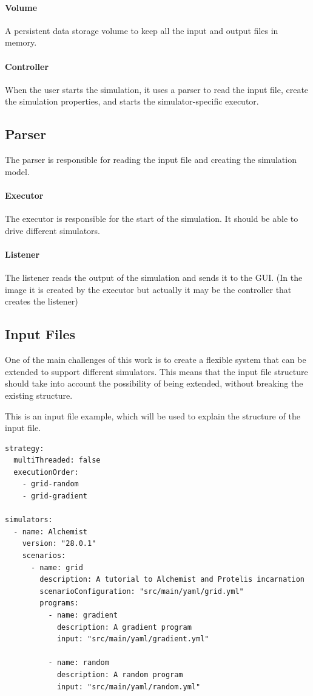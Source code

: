 \documentclass[12pt,a4paper,openright,twoside]{book}
\begin{document}
\paragraph*{Volume} A persistent data storage volume to keep all the input and output files in memory.

\paragraph*{Controller} When the user starts the simulation, it uses a parser to read the input file, create the simulation properties,
and starts the simulator-specific executor.

\subsection{Parser} 
The parser is responsible for reading the input file and creating the simulation model.

\paragraph*{Executor} The executor is responsible for the start of the simulation. It should be able to drive different simulators.

\paragraph*{Listener} The listener reads the output of the simulation and sends it to the GUI.
(In the image it is created by the executor but actually it may be the controller that creates the listener)

\subsection{Input Files}

One of the main challenges of this work is to create a flexible system that can be extended to support different simulators.
This means that the input file structure should take into account the possibility of being extended, without breaking the existing structure.

This is an input file example, which will be used to explain the structure of the input file.

\begin{lstlisting}[style=yaml]
strategy:
  multiThreaded: false
  executionOrder:
    - grid-random
    - grid-gradient

simulators:
  - name: Alchemist
    version: "28.0.1"
    scenarios:
      - name: grid
        description: A tutorial to Alchemist and Protelis incarnation
        scenarioConfiguration: "src/main/yaml/grid.yml"
        programs:
          - name: gradient
            description: A gradient program
            input: "src/main/yaml/gradient.yml"

          - name: random
            description: A random program
            input: "src/main/yaml/random.yml"
\end{lstlisting}
\end{document}
